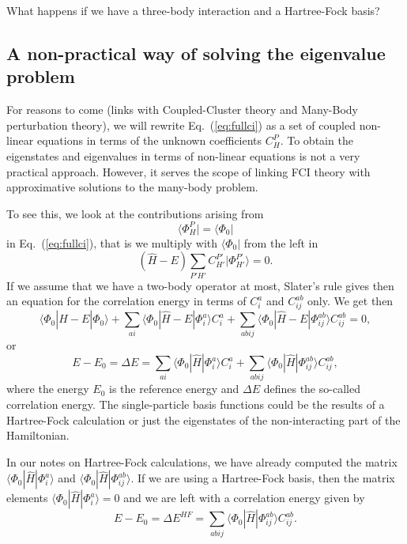 \documentclass[%
twoside,                 %
final,                   %
10pt]{article}
\begin{document}
\noindent
What happens if we have a three-body interaction and a Hartree-Fock basis? 


\subsection{A non-practical way of solving the eigenvalue problem}

For reasons to come (links with Coupled-Cluster theory and Many-Body perturbation theory), 
we will rewrite Eq.~(\ref{eq:fullci}) as a set of coupled non-linear equations in terms of the unknown coefficients $C_H^P$. 
To obtain the eigenstates and eigenvalues in terms of non-linear equations is not a very practical approach. However, it serves the scope of linking FCI theory with approximative solutions to the many-body problem.

To see this, we look at the contributions arising from 
\[
\langle \Phi_H^P | = \langle \Phi_0|
\]
in  Eq.~(\ref{eq:fullci}), that is we multiply with $\langle \Phi_0 |$
from the left in 
\[
(\hat{H} -E)\sum_{P'H'}C_{H'}^{P'}|\Phi_{H'}^{P'} \rangle=0. 
\]
If we assume that we have a two-body operator at most, Slater's rule gives then an equation for the 
correlation energy in terms of $C_i^a$ and $C_{ij}^{ab}$ only.  We get then
\[
\langle \Phi_0 | \hat{H} -E| \Phi_0\rangle + \sum_{ai}\langle \Phi_0 | \hat{H} -E|\Phi_{i}^{a} \rangle C_{i}^{a}+
\sum_{abij}\langle \Phi_0 | \hat{H} -E|\Phi_{ij}^{ab} \rangle C_{ij}^{ab}=0,
\]
or 
\[
E-E_0 =\Delta E=\sum_{ai}\langle \Phi_0 | \hat{H}|\Phi_{i}^{a} \rangle C_{i}^{a}+
\sum_{abij}\langle \Phi_0 | \hat{H}|\Phi_{ij}^{ab} \rangle C_{ij}^{ab},
\]
where the energy $E_0$ is the reference energy and $\Delta E$ defines the so-called correlation energy.
The single-particle basis functions  could be the results of a Hartree-Fock calculation or just the eigenstates of the non-interacting part of the Hamiltonian. 

In our notes on Hartree-Fock calculations, 
we have already computed the matrix $\langle \Phi_0 | \hat{H}|\Phi_{i}^{a}\rangle $ and $\langle \Phi_0 | \hat{H}|\Phi_{ij}^{ab}\rangle$.  If we are using a Hartree-Fock basis, then the matrix elements
$\langle \Phi_0 | \hat{H}|\Phi_{i}^{a}\rangle=0$ and we are left with a correlation energy given by
\[
E-E_0 =\Delta E^{HF}=\sum_{abij}\langle \Phi_0 | \hat{H}|\Phi_{ij}^{ab} \rangle C_{ij}^{ab}. 
\]
\end{document}
